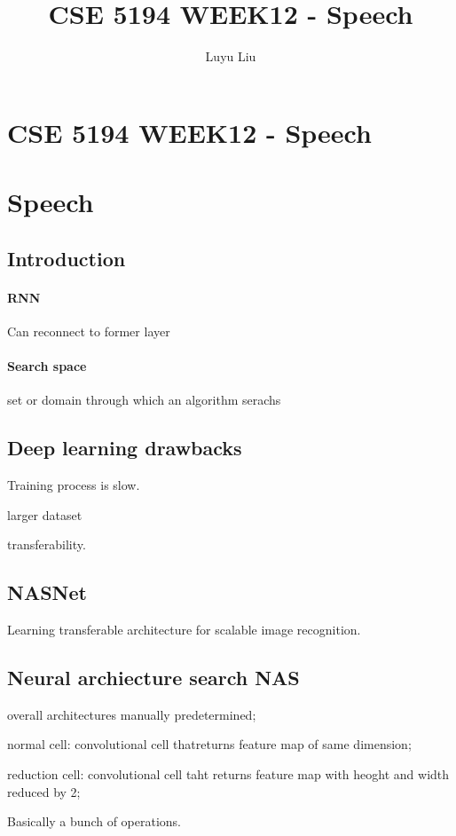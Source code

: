 \documentclass[12pt]{article}
\begin{document}
\author{Luyu Liu}

\newcommand\para{\par\refstepcounter{para}\thepara\space}

\section*{CSE 5194 WEEK12 - Speech}
\title{CSE 5194 WEEK12 - Speech}
\section{Speech}
\subsection{Introduction}
\paragraph{RNN} Can reconnect to former layer
\paragraph{Search space} set or domain through which an algorithm serachs

\subsection{Deep learning drawbacks}
Training process is slow.

larger dataset

transferability.

\subsection{NASNet}
Learning  transferable architecture for scalable image recognition.

\subsection{Neural archiecture search NAS}

overall architectures manually predetermined;

normal cell: convolutional cell thatreturns feature map of same dimension;

reduction cell: convolutional cell taht returns feature map with heoght and width reduced by 2;

Basically a bunch of operations.
\end{document}
